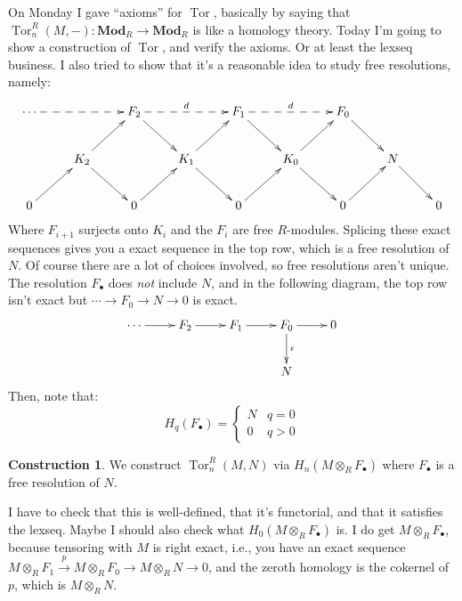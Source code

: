 \documentclass{amsart}
\theoremstyle{theorem}
\theoremstyle{definition}
\newtheorem{construction}[theorem]{Construction}
\DeclareMathOperator{\Tor}{Tor}
\begin{document}
On Monday I gave ``axioms'' for $\Tor$, basically by saying that $\Tor^R_n(M,-):\mathbf{Mod}_R\to\mathbf{Mod}_R$ is like a homology theory. Today I'm going to show a construction of $\Tor$, and verify the axioms. Or at least the lexseq business. I also tried to show that it's a reasonable idea to study free resolutions, namely:
\begin{equation*}
\xymatrix{\cdots\ar@{-->}[rr] & & F_2\ar[dr]\ar@{-->}[rr]^d & & F_1\ar[dr]\ar@{-->}[rr]^d & & F_0\ar[dr]\\
& K_2\ar[ur]\ar[dr] & & K_1\ar[ur]\ar[dr] & & K_0\ar[ur]\ar[dr] & & N\ar[dr]\\
0\ar[ur] & & 0\ar[ur] & & 0\ar[ur] & & 0\ar[ur] & & 0}
\end{equation*}
Where $F_{i+1}$ surjects onto $K_i$ and the $F_i$ are free $R$-modules. Splicing these exact sequences gives you a exact sequence in the top row, which is a free resolution of $N$. Of course there are a lot of choices involved, so free resolutions aren't unique. The resolution $F_\bullet$ does \emph{not} include $N$, and in the following diagram, the top row isn't exact but $\cdots\to F_0\to N\to 0$ is exact.
\begin{equation*}
\xymatrix{\cdots\ar[r] & F_2\ar[r] & F_1\ar[r] & F_0\ar[r]\ar[d]^\epsilon & 0\\
 & & & N & }
\end{equation*}
Then, note that:
\begin{equation*}
 H_q(F_\bullet)=\begin{cases}
N & q=0\\
0 & q>0
\end{cases}
\end{equation*}
\begin{construction}
We construct $\Tor^R_n(M,N)$ via $ H_n(M\otimes_R F_\bullet)$ where $F_\bullet$ is a free resolution of $N$.
\end{construction}
I have to check that this is well-defined, that it's functorial, and that it satisfies the lexseq. Maybe I should also check what $ H_0(M\otimes_R F_\bullet)$ is. I do get $M\otimes_R F_\bullet$, because tensoring with $M$ is right exact, i.e., you have an exact sequence $M\otimes_R F_1\xrightarrow{p} M\otimes_R F_0\to M\otimes_R N\to 0$, and the zeroth homology is the cokernel of $p$, which is $M\otimes_R N$.
\end{document}
